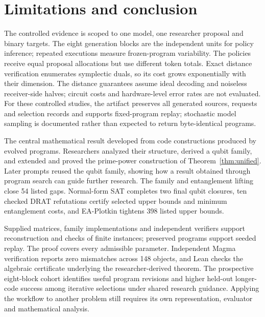 \documentclass{article}
\begin{document}
\FloatBarrier
\section{Limitations and conclusion}\label{sec:limitations}

The controlled evidence is scoped to one model, one researcher proposal
and binary targets. The eight generation blocks are the independent
units for policy inference; repeated executions measure frozen-program
variability. The policies receive equal proposal allocations but use
different token totals. Exact distance verification
enumerates symplectic duals, so its cost grows exponentially with their
dimension. The distance guarantees assume ideal decoding and noiseless
receiver-side halves; circuit costs and hardware-level error rates
are not evaluated. For these controlled studies, the artifact preserves
all generated sources, requests and selection records and supports fixed-program replay;
stochastic model sampling is documented rather than expected to return
byte-identical programs.

The central mathematical result developed from code constructions
produced by evolved programs. Researchers analyzed their structure,
derived a qubit family, and extended and proved the prime-power
construction of Theorem~\ref{thm:unified}. Later prompts reused the
qubit family, showing how a result obtained through program search can
guide further research. The family and entanglement lifting close 54
listed gaps. Normal-form SAT completes two final qubit closures, ten
checked DRAT refutations certify selected upper bounds and minimum
entanglement costs, and EA-Plotkin tightens 398 listed upper bounds.

Supplied matrices, family implementations and independent verifiers
support reconstruction and checks of finite instances; preserved programs
support seeded replay. The proof covers every admissible parameter.
Independent Magma verification reports zero mismatches across 148
objects, and Lean checks the algebraic certificate underlying the
researcher-derived theorem. The prospective eight-block cohort identifies
useful program revisions and higher held-out longer-code success among
iterative selections under shared research guidance. Applying the
workflow to another problem still requires its own representation,
evaluator and mathematical analysis.


\end{document}
